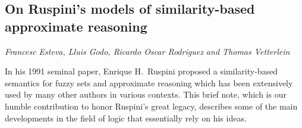 \documentclass[../booklet.tex]{subfiles}
\begin{document}
\subsection[On Ruspini's models of similarity-based approximate reasoning. {\it Francesc Esteva, Lluis Godo, Ricardo Oscar Rodriguez and Thomas Vetterlein}]{On Ruspini's models of similarity-based approximate reasoning}
   

\begin{center}
  {\it Francesc Esteva, Lluis Godo, Ricardo Oscar Rodriguez and Thomas Vetterlein}
\end{center}



%
In his 1991 seminal paper, Enrique H.\ Ruspini proposed a similarity-based semantics for fuzzy sets and approximate reasoning which has been extensively used by many other authors in various contexts. This brief note, which is our humble contribution to honor Ruspini's great legacy, describes some of the main developments in the field of logic that essentially rely on his ideas.
%
\end{document}

